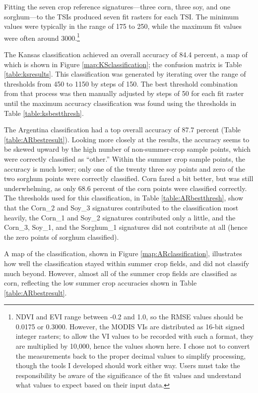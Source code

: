 Fitting the seven crop reference signatures---three corn, three soy, and one sorghum---to the TSIs produced seven fit rasters for each TSI. The minimum values were typically in the range of 175 to 250, while the maximum fit values were often around 3000.\footnote{NDVI and EVI range between -0.2 and 1.0, so the RMSE values should be 0.0175 or 0.3000. However, the MODIS VIs are distributed as 16-bit signed integer rasters; to allow the VI values to be recorded with such a format, they are multiplied by 10,000, hence the values shown here. I chose not to convert the measurements back to the proper decimal values to simplify processing, though the tools I developed should work either way.  Users must take the responsibility be aware of the significance of the fit values and understand what values to expect based on their input data.} 

The Kansas classification achieved an overall accuracy of 84.4 percent, a map of which is shown in Figure \ref{map:KSclassification}; the confusion matrix is Table \ref{table:ksresults}. This classification was generated by iterating over the range of thresholds from 450 to 1150 by steps of 150. The best threshold combination from that process was then manually adjusted by steps of 50 for each fit raster until the maximum accuracy classification was found using the thresholds in Table \ref{table:ksbestthresh}.

The Argentina classification had a top overall accuracy of 87.7 percent (Table \ref{table:ARbestresult}). Looking more closely at the results, the accuracy seems to be skewed upward by the high number of non-summer-crop sample points, which were correctly classified as ``other.'' Within the summer crop sample points, the accuracy is much lower; only one of the twenty three soy points and zero of the two sorghum points were correctly classified. Corn fared a bit better, but was still underwhelming, as only 68.6 percent of the corn points were classified correctly. The thresholds used for this classification, in Table \ref{table:ARbestthresh}, show that the Corn\_2 and Soy\_3 signatures contributed to the classification most heavily, the Corn\_1 and Soy\_2 signatures contributed only a little, and the Corn\_3, Soy\_1, and the Sorghum\_1 signatures did not contribute at all (hence the zero points of sorghum classified).

A map of the classification, shown in Figure \ref{map:ARclassification}, illustrates how well the classification stayed within summer crop fields, and did not classify much beyond. However, almost all of the summer crop fields are classified as corn, reflecting the low summer crop accuracies shown in Table \ref{table:ARbestresult}.

